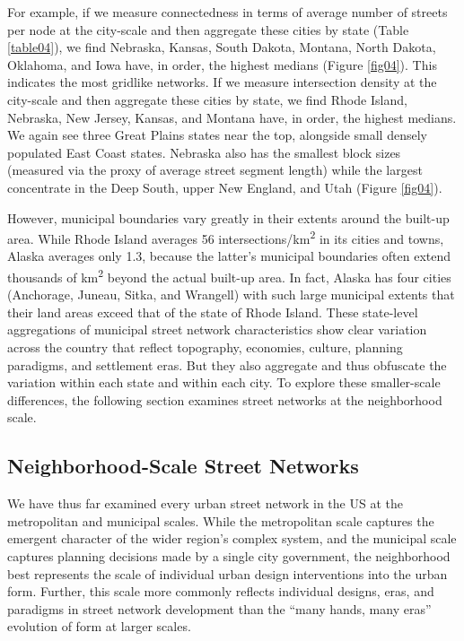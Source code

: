 \documentclass[Afour,sageh,times]{sagej}
\begin{document}
For example, if we measure connectedness in terms of average number of streets per node at the city-scale and then aggregate these cities by state (Table \ref{table04}), we find Nebraska, Kansas, South Dakota, Montana, North Dakota, Oklahoma, and Iowa have, in order, the highest medians (Figure \ref{fig04}). This indicates the most gridlike networks. If we measure intersection density at the city-scale and then aggregate these cities by state, we find Rhode Island, Nebraska, New Jersey, Kansas, and Montana have, in order, the highest medians. We again see three Great Plains states near the top, alongside small densely populated East Coast states. Nebraska also has the smallest block sizes (measured via the proxy of average street segment length) while the largest concentrate in the Deep South, upper New England, and Utah (Figure \ref{fig04}).

However, municipal boundaries vary greatly in their extents around the built-up area. While Rhode Island averages 56 intersections/km\textsuperscript{2} in its cities and towns, Alaska averages only 1.3, because the latter's municipal boundaries often extend thousands of km\textsuperscript{2} beyond the actual built-up area. In fact, Alaska has four cities (Anchorage, Juneau, Sitka, and Wrangell) with such large municipal extents that their land areas exceed that of the state of Rhode Island. These state-level aggregations of municipal street network characteristics show clear variation across the country that reflect topography, economies, culture, planning paradigms, and settlement eras. But they also aggregate and thus obfuscate the variation within each state and within each city. To explore these smaller-scale differences, the following section examines street networks at the neighborhood scale.



\subsection{Neighborhood-Scale Street Networks}

We have thus far examined every urban street network in the US at the metropolitan and municipal scales. While the metropolitan scale captures the emergent character of the wider region's complex system, and the municipal scale captures planning decisions made by a single city government, the neighborhood best represents the scale of individual urban design interventions into the urban form. Further, this scale more commonly reflects individual designs, eras, and paradigms in street network development than the \enquote{many hands, many eras} evolution of form at larger scales.
\end{document}
